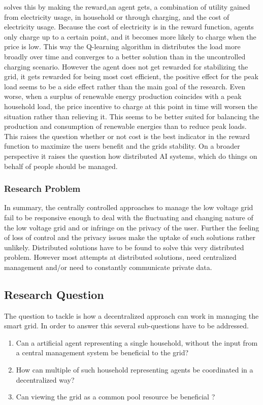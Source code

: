 \documentclass[a4paper]{article}
\begin{document}
\cite{reinforce_money} solves this by making the reward,an agent gets, a combination of
utility gained from electricity usage, in household or through charging, and the cost of electricity usage.  Because the cost of
electricity is in the reward
function, agents only charge up to a certain point, and it becomes more likely to charge when the price is low. This way the 
Q-learning algorithm in \cite{reinforce_money} distributes
the load more broadly over time and converges to a better solution than in the uncontrolled charging scenario. However the agent does 
not get rewarded for stabilizing the grid, it gets
rewarded for being most cost efficient, the positive effect for the peak load seems to be a side effect rather than the main goal of 
the research.  Even worse, when a surplus of renewable energy production coincides with a peak household load, the price incentive to 
charge at this point in time will worsen the situation rather than relieving it. This seems to be better suited for balancing the 
production and consumption of renewable energies than to reduce peak loads.
This raises the question whether or not cost is the best indicator in the 
reward function to maximize the users benefit and the grids stability. On a broader perspective it raises the question how distributed
AI systems, which do things on behalf of people should be managed. \\ 
\subsubsection{Research Problem}
In summary, the centrally controlled approaches to manage the low voltage grid fail to be responsive enough to deal with the 
fluctuating and changing nature of the low voltage grid and or infringe on the privacy of the user. Further the feeling of 
loss of control and the privacy issues make the uptake of such solutions rather unlikely. Distributed solutions have to be found to solve 
this very distributed problem. However most attempts at distributed solutions, need centralized management and/or need to constantly 
communicate private data.



\subsection{Research Question}
The question to tackle is how a decentralized approach can work in managing the smart grid. In order to answer this several 
sub-questions have to be addressed. 
\begin{enumerate}
\item Can a artificial agent representing a single household, without the input from a central management system be beneficial to the grid?
\item How can multiple of  such household representing agents be coordinated in a decentralized way?
\item Can viewing the grid as a common pool resource be beneficial ?
\end{enumerate}
\end{document}

